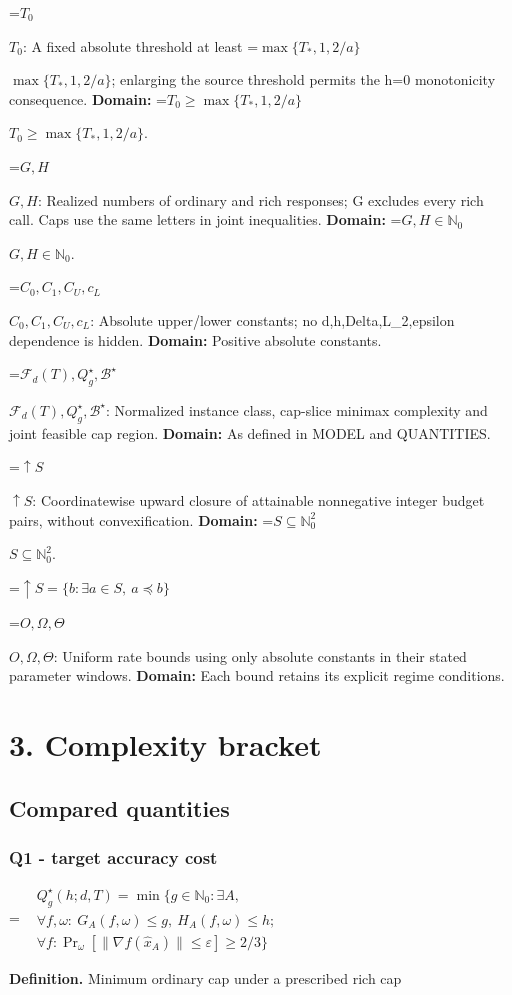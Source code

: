 \documentclass[10pt,a4paper]{article}
\newcommand{\AtlasMath}[1]{\par\begingroup\centering\setbox0=\hbox{$\displaystyle #1$}\ifdim\wd0>1.4\linewidth\typeout{ATLAS WIDE FORMULA: \the\wd0}\fi\ifdim\wd0>\linewidth\resizebox{\linewidth}{!}{\box0}\else\box0\fi\par\endgroup}
\newcommand{\AtlasInlineMath}[1]{\begingroup\setbox0=\hbox{$#1$}\ifdim\wd0>.4\linewidth\endgroup\AtlasMath{#1}\else\endgroup$#1$\fi}
\begin{document}
\AtlasInlineMath{T_0}: A fixed absolute threshold at least \AtlasInlineMath{\max\{T_*,1,2/a\}}; enlarging the source threshold permits the h=0 monotonicity consequence. \textbf{Domain:} \AtlasInlineMath{T_0\ge\max\{T_*,1,2/a\}}.

\AtlasInlineMath{G,H}: Realized numbers of ordinary and rich responses; G excludes every rich call. Caps use the same letters in joint inequalities. \textbf{Domain:} \AtlasInlineMath{G,H\in\mathbb N_0}.

\AtlasInlineMath{C_0,C_1,C_U,c_L}: Absolute upper/lower constants; no d,h,Delta,L\_2,epsilon dependence is hidden. \textbf{Domain:} Positive absolute constants.

\AtlasInlineMath{\mathcal F_d(T),Q_g^\star,\mathcal B^\star}: Normalized instance class, cap-slice minimax complexity and joint feasible cap region. \textbf{Domain:} As defined in MODEL and QUANTITIES.

\AtlasInlineMath{\uparrow S}: Coordinatewise upward closure of attainable nonnegative integer budget pairs, without convexification. \textbf{Domain:} \AtlasInlineMath{S\subseteq\mathbb N_0^2}.

\AtlasMath{\uparrow S=\{b:\exists a\in S,\ a\preceq b\}}
\AtlasInlineMath{O,\Omega,\Theta}: Uniform rate bounds using only absolute constants in their stated parameter windows. \textbf{Domain:} Each bound retains its explicit regime conditions.

\section{3. Complexity bracket}
\subsection{Compared quantities}
\subsubsection{Q1 - target accuracy cost}
\AtlasMath{\begin{aligned}&Q_g^\star(h;d,T)=\min\{g\in\mathbb N_0:\exists A,\\[3pt]&\forall f,\omega:\ G_A(f,\omega)\le g,\ H_A(f,\omega)\le h;\\[3pt]&\forall f:\Pr_\omega[\|\nabla f(\widehat x_A)\|\le\varepsilon]\ge2/3\}\end{aligned}}
\textbf{Definition.} Minimum ordinary cap under a prescribed rich cap
\end{document}
